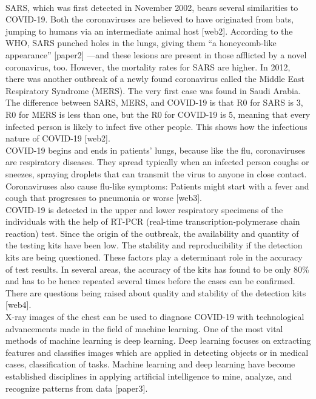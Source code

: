 \documentclass[12pt]{revtex4}
\begin{document}
\\SARS, which was first detected in November 2002, bears several similarities to COVID-19. Both the coronaviruses are believed to have originated from bats, jumping to humans via an intermediate animal host [web2]. According to the WHO, SARS punched holes in the lungs, giving them “a honeycomb-like appearance” [paper2] —and these lesions are present in those afflicted by a novel coronavirus, too. However, the mortality rates for SARS are higher. In 2012, there was another outbreak of a newly found coronavirus called the Middle East Respiratory Syndrome (MERS). The very first case was found in Saudi Arabia. The difference between SARS, MERS, and COVID-19 is that R0 for SARS is 3, R0 for MERS is less than one, but the R0 for COVID-19 is 5, meaning that every infected person is likely to infect five other people. This shows how the infectious nature of COVID-19 [web2].
\\COVID-19 begins and ends in patients’ lungs, because like the flu, coronaviruses are respiratory diseases. They spread typically when an infected person coughs or sneezes, spraying droplets that can transmit the virus to anyone in close contact. Coronaviruses also cause flu-like symptoms: Patients might start with a fever and cough that progresses to pneumonia or worse [web3].
\\COVID-19 is detected in the upper and lower respiratory specimens of the individuals with the help of RT-PCR (real-time transcription-polymerase chain reaction) test. Since the origin of the outbreak, the availability and quantity of the testing kits have been low. The stability and reproducibility if the detection kits are being questioned. These factors play a determinant role in the accuracy of test results. In several areas, the accuracy of the kits has found to be only 80\% and has to be hence repeated several times before the cases can be confirmed. There are questions being raised about quality and stability of the detection kits [web4].
\\X-ray images of the chest can be used to diagnose COVID-19 with technological advancements made in the field of machine learning. One of the most vital methods of machine learning is deep learning. Deep learning focuses on extracting features and classifies images which are applied in detecting objects or in medical cases, classification of tasks. Machine learning and deep learning have become established disciplines in applying artificial intelligence to mine, analyze, and recognize patterns from data [paper3]. 
\end{document}
